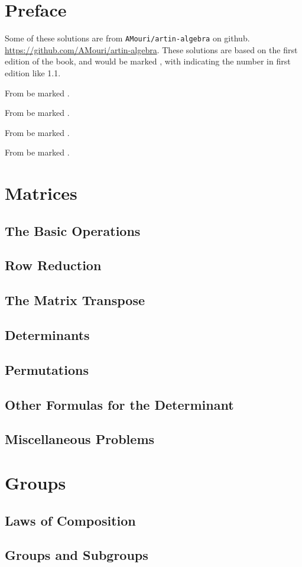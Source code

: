 \documentclass[openany]{book}
\begin{document}
\frontmatter
\tableofcontents
\chapter{Preface}
Some of these solutions are from \texttt{AMouri/artin-algebra} on github. 
\url{https://github.com/AMouri/artin-algebra}.
These solutions are based on the first edition of the book, and would 
be marked {\color{cBlue}\textbullet}, with indicating the number in first edition 
like {\color{cBlue}1.1}.

From be marked {\color{red}\textbullet}.

From be marked {\color{lime}\textbullet}.

From be marked {\color{gray}\textbullet}.

From be marked {\color{purple}\textbullet}.

\mainmatter
\chapter{Matrices}
\section{The Basic Operations}

\section{Row Reduction}

\section{The Matrix Transpose}
\section{Determinants}
\section{Permutations}
\section{Other Formulas for the Determinant}
\section*{Miscellaneous Problems}


\chapter{Groups}

\section{Laws of Composition}
\section{Groups and Subgroups}

\end{document}
